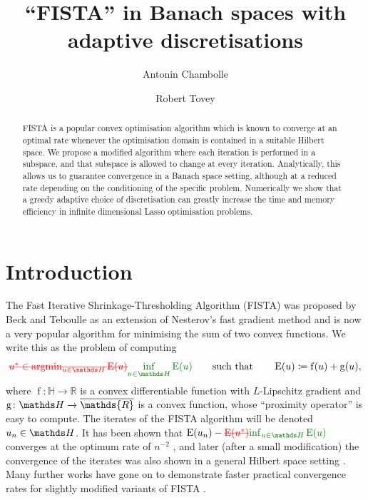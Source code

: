 \documentclass[smallextended]{svjour3}
\author{Antonin Chambolle \and Robert Tovey }
\institute{A. Chambolle \at
	CEREMADE, CNRS \& Université Paris Dauphine, PSL Research University, Paris \\
	\email{chambolle@ceremade.dauphine.fr}, ORCID: 0000-0002-9465-4659          %
	\and
	R. Tovey \at
	MOKAPLAN, INRIA Paris, Paris \\
	\email{robert.tovey@inria.fr}, ORCID: 0000-0001-5411-2268
}
\title{``FISTA'' in Banach spaces with adaptive discretisations}
\let\F\mathds\let\C\mathcal\newcommand{\R}{\F{R}}\newcommand{\A}{\tens{A}}
\newcommand{\op}[1]{\operatorname{#1}}
\newcommand{\1}{\F{1}}
\DeclareMathOperator*{\argmin}{argmin}
\newcommand{\Emin}[1][\varf0]{\inf_{#1\in\F H}\op{E}(#1)}
\newcommand*{\varf}[1]{%
	\IfEqCase{#1}{%
		{0}{u}%
		{1}{v}%
		{2}{w}%
	}[u#1]%
}
\newcommand{\edit}[2]{{\ifmmode\text{\color{red}\sout{\ensuremath{#1}}}\else {\color{red} \sout{#1}}\fi} {\color{darkgreen} #2}}
\begin{document}
	\maketitle
	
	\begin{abstract}
		FISTA is a popular convex optimisation algorithm which is known to converge at an optimal rate whenever the optimisation domain is contained in a suitable Hilbert space. We propose a modified algorithm where each iteration is performed in a subspace, and that subspace is allowed to change at every iteration. Analytically, this allows us to guarantee convergence in a Banach space setting, although at a reduced rate depending on the conditioning of the specific problem. Numerically we show that a greedy adaptive choice of discretisation can greatly increase the time and memory efficiency in infinite dimensional Lasso optimisation problems.
	\end{abstract}
	
	\section{Introduction}
	The Fast Iterative Shrinkage-Thresholding Algorithm (FISTA) was proposed by Beck and Teboulle \cite{Beck2009} as an extension of Nesterov's fast gradient method \cite{Nesterov2004} and is now a very popular algorithm for minimising the sum of two convex functions.
	We write this as the problem of computing
	\begin{equation}\label{eq: min F = fD+fC}
		\edit{u^* \in \argmin_{\varf0\in\F H}\op{E}(\varf0)}{\Emin}  \qquad\text{such that}\qquad \op{E}(\varf0)\coloneqq \op{f}(\varf0) + \op{g}(\varf0),
	\end{equation}
	where $\op{f}\colon\F H\to\R$ is a convex differentiable function with $L$-Lipschitz gradient and $\op{g}\colon\F H\to\bar\R$ is a convex function, whose ``proximity operator'' is easy to compute. The iterates of the FISTA algorithm will be denoted $\varf0_n\in\F H$. It has been shown that $\op{E}(\varf0_n) - \edit{\op{E}(u^*)}{\Emin}$ converges at the optimum rate of $n^{-2}$ \cite{Beck2009}, and later (after a small modification) the convergence of the iterates was also shown in a general Hilbert space setting \cite{Chambolle2015}. Many further works have gone on to demonstrate faster practical convergence rates for slightly modified variants of FISTA \cite{Tao2016,Liang2017,Alamo2019}.
	
\end{document}

